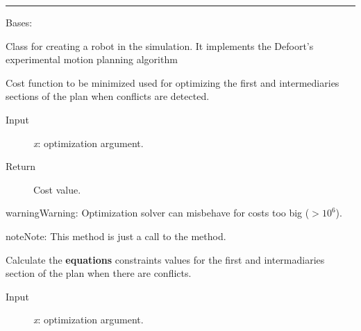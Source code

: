 \documentclass[letterpaper,10pt,english]{sphinxmanual}
\begin{document}
\bigskip\hrule{}\bigskip


\begin{fulllineitems}
\label{Multi-robot motion planner:planning_sim.Robot}
Bases: \href{http://docs.python.org/library/functions.html\#object}{}

Class for creating a robot in the simulation.
It implements the Defoort's experimental motion planning algorithm

\begin{fulllineitems}
\label{Multi-robot motion planner:planning_sim.Robot._co_criterion}
Cost function to be minimized used for optimizing
the first and intermediaries sections of the plan when conflicts are detected.
\begin{description}
\item[{Input}] \leavevmode
\emph{x}: optimization argument.

\item[{Return}] \leavevmode
Cost value.

\end{description}

\begin{notice}{warning}{Warning:}
Optimization solver can misbehave for costs too big (\(> 10^{6}\)).
\end{notice}

\begin{notice}{note}{Note:}
This method is just a call to the {\hyperref[Multi-robot motion planner:planning_sim.Robot._sa_criterion]{}} method.
\end{notice}

\end{fulllineitems}


\begin{fulllineitems}
\label{Multi-robot motion planner:planning_sim.Robot._co_feqcons}
Calculate the \textbf{equations} constraints values for the first and intermadiaries
section of the plan when there are conflicts.
\begin{description}
\item[{Input}] \leavevmode
\emph{x}: optimization argument.


\end{description}
\end{fulllineitems}
\end{fulllineitems}
\end{document}
